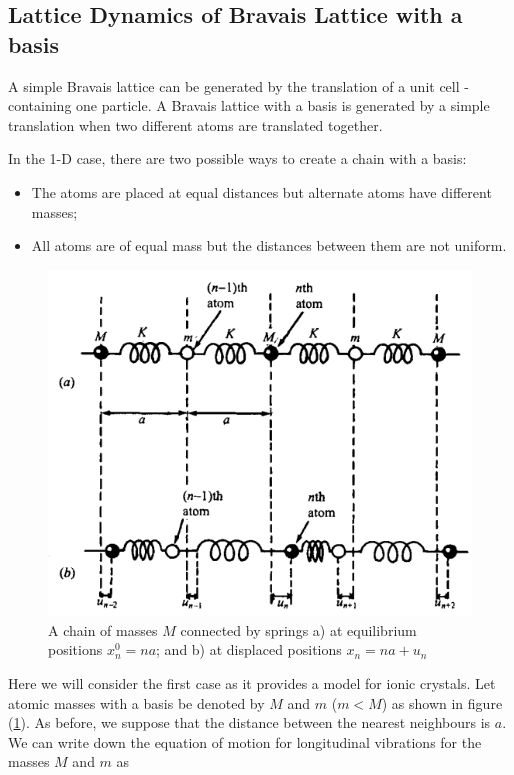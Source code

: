 \documentclass[%
 aip,
 amsmath,amssymb,
 reprint, floatfix%
]{revtex4-1}
\begin{document}
    \subsection{Lattice Dynamics of Bravais Lattice with a basis}
    A simple Bravais lattice can be generated by the translation of a unit cell - containing one particle. A Bravais lattice with a basis is generated by a simple translation when two different atoms are translated together.
    \par
    In the 1-D case, there are two possible ways to create a chain with a basis:
    \begin{itemize}
        \item The atoms are placed at equal distances but alternate atoms have different masses;
        \item All atoms are of equal mass but the distances between them are not uniform. 
    \end{itemize} 
    \begin{figure}
        \centering
        \includegraphics[scale = 0.5]{Figures/unequalchain.png}
        \caption{A chain of masses $M$ connected by springs a) at equilibrium positions $x_n^0 = na$; and b) at displaced positions $x_n = na + u_n$}
        \label{fig:uneqchain}
    \end{figure}
    Here we will consider the first case as it provides a model for ionic crystals. Let atomic masses with a basis be denoted by $M$ and $m$ ($m < M$) as shown in figure (\ref{fig:uneqchain}). As before, we suppose that the distance between the nearest neighbours is $a$. We can write down the equation of motion for longitudinal vibrations for the masses $M$ and $m$ as
\end{document}
